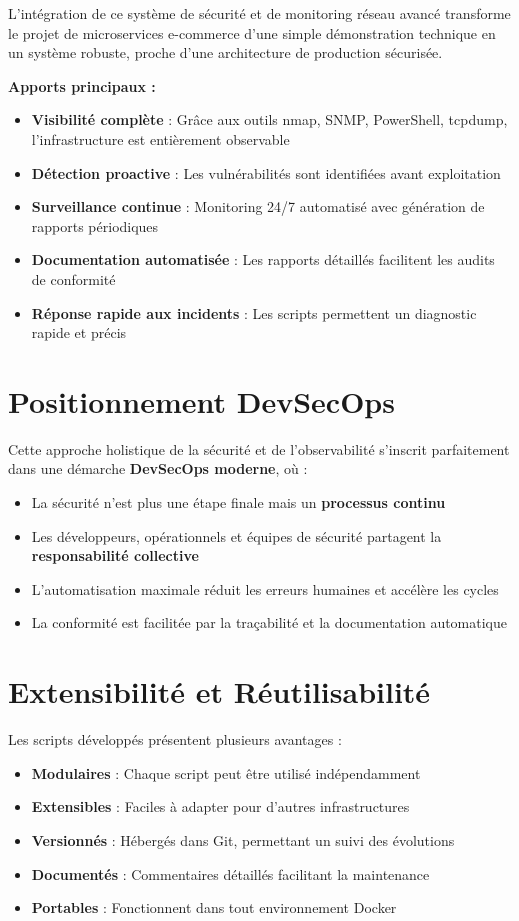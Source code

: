 \documentclass[11pt,a4paper]{report}
\begin{document}
L'intégration de ce système de sécurité et de monitoring réseau avancé transforme le projet de microservices e-commerce d'une simple démonstration technique en un système robuste, proche d'une architecture de production sécurisée.

\textbf{Apports principaux :}
\begin{itemize}
    \item \textbf{Visibilité complète} : Grâce aux outils nmap, SNMP, PowerShell, tcpdump, l'infrastructure est entièrement observable
    \item \textbf{Détection proactive} : Les vulnérabilités sont identifiées avant exploitation
    \item \textbf{Surveillance continue} : Monitoring 24/7 automatisé avec génération de rapports périodiques
    \item \textbf{Documentation automatisée} : Les rapports détaillés facilitent les audits de conformité
    \item \textbf{Réponse rapide aux incidents} : Les scripts permettent un diagnostic rapide et précis
\end{itemize}

\section{Positionnement DevSecOps}

Cette approche holistique de la sécurité et de l'observabilité s'inscrit parfaitement dans une démarche \textbf{DevSecOps moderne}, où :
\begin{itemize}
    \item La sécurité n'est plus une étape finale mais un \textbf{processus continu}
    \item Les développeurs, opérationnels et équipes de sécurité partagent la \textbf{responsabilité collective}
    \item L'automatisation maximale réduit les erreurs humaines et accélère les cycles
    \item La conformité est facilitée par la traçabilité et la documentation automatique
\end{itemize}

\section{Extensibilité et Réutilisabilité}

Les scripts développés présentent plusieurs avantages :
\begin{itemize}
    \item \textbf{Modulaires} : Chaque script peut être utilisé indépendamment
    \item \textbf{Extensibles} : Faciles à adapter pour d'autres infrastructures
    \item \textbf{Versionnés} : Hébergés dans Git, permettant un suivi des évolutions
    \item \textbf{Documentés} : Commentaires détaillés facilitant la maintenance
    \item \textbf{Portables} : Fonctionnent dans tout environnement Docker
\end{itemize}
\end{document}
